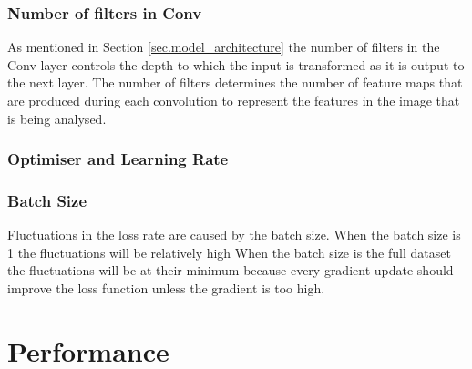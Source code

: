 \subsubsection{Number of filters in Conv}
As mentioned in Section \ref{sec.model_architecture} the number of filters in the Conv layer controls the depth to which the input is transformed as it is output to the next layer. The number of filters determines the number of feature maps that are produced during each convolution to represent the features in the image that is being analysed. 

\subsubsection{Optimiser and Learning Rate}

\subsubsection{Batch Size}
Fluctuations in the loss rate are caused by the batch size. When the batch size is 1 the fluctuations will be relatively high When the batch size is the full dataset the fluctuations will be at their minimum because every gradient update should improve the loss function unless the gradient is too high. 

\section{Performance}

